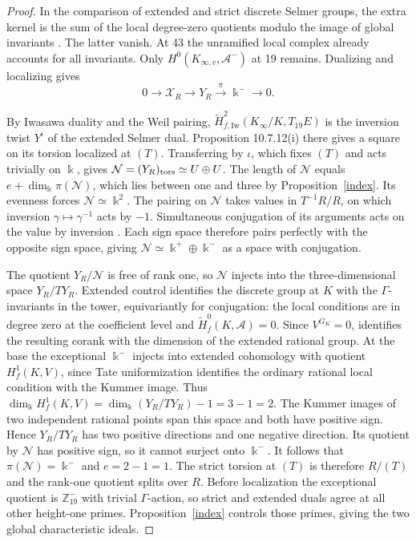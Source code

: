 \documentclass[11pt]{article}
\newcommand{\Z}{\mathbb Z}
\begin{document}
\begin{proof}
In the comparison of extended and strict discrete Selmer groups, the extra kernel is the sum of the local degree-zero quotients modulo the image of global invariants \cite[Lemma 9.6.3 and (9.6.5.1)]{Nek}. The latter vanish. At 43 the unramified local complex already accounts for all invariants. Only $H^0(K_{\infty,v},\mathcal A^-)$ at 19 remains. Dualizing and localizing gives
\[
0\longrightarrow\mathcal X_R\longrightarrow Y_R\xrightarrow{\pi}\Bbbk^-\longrightarrow0 .
\]

By Iwasawa duality \cite[8.9.6.2, degree two]{Nek} and the Weil pairing, $\widetilde H^2_{f,\mathrm{Iw}}(K_\infty/K,T_{19}E)$ is the inversion twist $Y^\iota$ of the extended Selmer dual. Proposition 10.7.12(i) there gives a square on its torsion localized at $(T)$. Transferring by $\iota$, which fixes $(T)$ and acts trivially on $\Bbbk$, gives $\mathcal N=(Y_R)_{\rm tors}\simeq U\oplus U$. The length of $\mathcal N$ equals $e+\dim_\Bbbk\pi(\mathcal N)$, which lies between one and three by Proposition~\ref{index}. Its evenness forces $\mathcal N\simeq \Bbbk^2$. The pairing on $\mathcal N$ takes values in $T^{-1}R/R$, on which inversion $\gamma\mapsto\gamma^{-1}$ acts by $-1$. Simultaneous conjugation of its arguments acts on the value by inversion \cite[10.3.5.7--8, 10.6.6--8]{Nek}. Each sign space therefore pairs perfectly with the opposite sign space, giving $\mathcal N\simeq \Bbbk^+\oplus \Bbbk^-$ as a space with conjugation.

The quotient $Y_R/\mathcal N$ is free of rank one, so $\mathcal N$ injects into the three-dimensional space $Y_R/TY_R$. Extended control \cite[Proposition 8.10.14(ii)]{Nek} identifies the discrete group at $K$ with the $\Gamma$-invariants in the tower, equivariantly for conjugation: the local conditions are in degree zero at the coefficient level and $\widetilde H_f^0(K,\mathcal A)=0$. Since $V^{G_K}=0$, \cite[Corollary 9.6.4]{Nek} identifies the resulting corank with the dimension of the extended rational group. At the base the exceptional $\Bbbk^-$ injects into extended cohomology with quotient $H^1_f(K,V)$, since Tate uniformization identifies the ordinary rational local condition with the Kummer image. Thus $\dim_\Bbbk H^1_f(K,V)=\dim_\Bbbk(Y_R/TY_R)-1=3-1=2$. The Kummer images of two independent rational points span this space and both have positive sign. Hence $Y_R/TY_R$ has two positive directions and one negative direction. Its quotient by $\mathcal N$ has positive sign, so it cannot surject onto $\Bbbk^-$. It follows that $\pi(\mathcal N)=\Bbbk^-$ and $e=2-1=1$. The strict torsion at $(T)$ is therefore $R/(T)$ and the rank-one quotient splits over $R$. Before localization the exceptional quotient is $\Z_{19}^-$ with trivial $\Gamma$-action, so strict and extended duals agree at all other height-one primes. Proposition~\ref{index} controls those primes, giving the two global characteristic ideals.
\end{proof}
\end{document}
